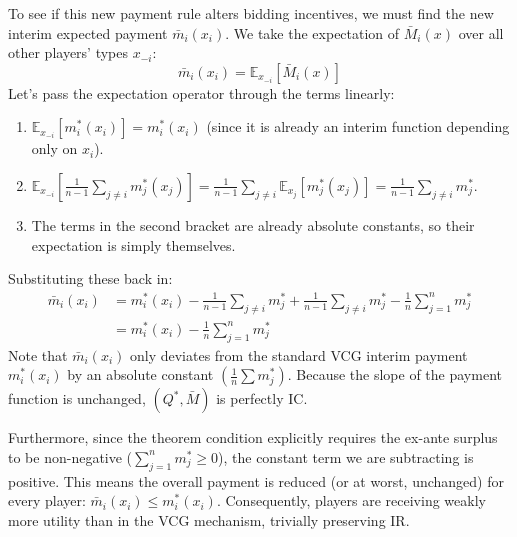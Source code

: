 {\begin{itemize}
To see if this new payment rule alters bidding incentives, we must find the new interim expected payment $\bar{m}_i(x_i)$. We take the expectation of $\bar{M}_i(x)$ over all other players' types $x_{-i}$:
\[
\bar{m}_i(x_i) = \mathbb{E}_{x_{-i}}[\bar{M}_i(x)]
\]
Let's pass the expectation operator through the terms linearly:
\begin{enumerate}
    \item $\mathbb{E}_{x_{-i}}[m_i^*(x_i)] = m_i^*(x_i)$ (since it is already an interim function depending only on $x_i$).
    \item $\mathbb{E}_{x_{-i}} \left[ \frac{1}{n-1}\sum_{j\ne i}m_j^*(x_j) \right] = \frac{1}{n-1}\sum_{j\ne i}\mathbb{E}_{x_j}[m_j^*(x_j)] = \frac{1}{n-1}\sum_{j\ne i}m_j^*$. 
    \item The terms in the second bracket are already absolute constants, so their expectation is simply themselves.
\end{enumerate}

Substituting these back in:
\[
\begin{aligned}
  \bar{m}_i(x_i) & = m_i^*(x_i) - {\frac{1}{n-1}\sum_{j\ne i}m_j^*} + {\frac{1}{n-1}\sum_{j\ne i}m_j^*} - \frac{1}{n}\sum_{j = 1}^{n}m_j^*\\
  &  = m_i^*(x_i) - \frac{1}{n}\sum_{j = 1}^{n}m_j^*
\end{aligned}
\]
Note that $\bar{m}_i(x_i)$ only deviates from the standard VCG interim payment $m_i^*(x_i)$ by an absolute constant $\left(\frac{1}{n}\sum m_j^*\right)$. Because the slope of the payment function is unchanged, $(Q^*, \bar{M})$ is perfectly IC.

Furthermore, since the theorem condition explicitly requires the ex-ante surplus to be non-negative ($\sum_{j = 1}^n m_j^* \ge 0$), the constant term we are subtracting is positive. This means the overall payment is reduced (or at worst, unchanged) for every player: $\bar{m}_i(x_i) \le m_i^*(x_i)$. Consequently, players are receiving weakly more utility than in the VCG mechanism, trivially preserving IR.
  \end{itemize}
}

